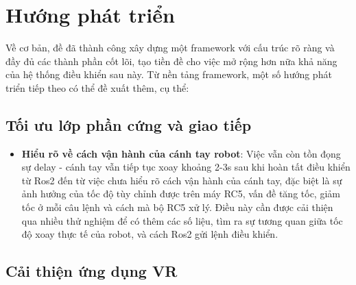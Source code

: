 \section{Hướng phát triển}

Về cơ bản, đề đã thành công xây dựng một framework với cấu trúc rõ ràng và đầy đủ các thành phần cốt lõi, tạo tiền đề cho việc mở rộng hơn nữa khả năng của hệ thống điều khiển sau này. Từ nền tảng framework, một số hướng phát triển tiếp theo có thể đề xuất thêm, cụ thể:

\subsection{Tối ưu lớp phần cứng và giao tiếp}

\begin{itemize}
\item \textbf{Hiểu rõ về cách vận hành của cánh tay robot}: Việc vẫn còn tồn đọng sự delay - cánh tay vẫn tiếp tục xoay khoảng 2-3s sau khi hoàn tất điều khiển từ Ros2 đến từ việc chưa hiểu rõ cách vận hành của cánh tay, đặc biệt là sự ảnh hưởng của tốc độ tùy chỉnh được trên máy RC5, vấn đề tăng tốc, giảm tốc ở mỗi câu lệnh và cách mà bộ RC5 xử lý. Điều này cần được cải thiện qua nhiều thử nghiệm để có thêm các số liệu, tìm ra sự tương quan giữa tốc độ xoay thực tế của robot, và cách Ros2 gửi lệnh điều khiển. 
\end{itemize}

\subsection{Cải thiện ứng dụng VR}

